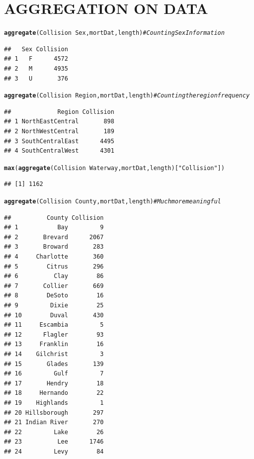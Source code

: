 \documentclass{article}\usepackage[]{graphicx}\usepackage[]{color}
\makeatletter
\newcommand{\hlstr}[1]{\textcolor[rgb]{0.192,0.494,0.8}{#1}}%
\newcommand{\hlcom}[1]{\textcolor[rgb]{0.678,0.584,0.686}{\textit{#1}}}%
\newcommand{\hlopt}[1]{\textcolor[rgb]{0,0,0}{#1}}%
\newcommand{\hlstd}[1]{\textcolor[rgb]{0.345,0.345,0.345}{#1}}%
\newcommand{\hlkwd}[1]{\textcolor[rgb]{0.737,0.353,0.396}{\textbf{#1}}}%
\newenvironment{kframe}{%
 \def\at@end@of@kframe{}%
 \ifinner\ifhmode%
  \def\at@end@of@kframe{\end{minipage}}%
  \begin{minipage}{\columnwidth}%
 \fi\fi%
 \def\FrameCommand##1{\hskip\@totalleftmargin \hskip-\fboxsep
 \colorbox{shadecolor}{##1}\hskip-\fboxsep
     \hskip-\linewidth \hskip-\@totalleftmargin \hskip\columnwidth}%
 \MakeFramed {\advance\hsize-\width
   \@totalleftmargin\z@ \linewidth\hsize
   \@setminipage}}%
 {\par\unskip\endMakeFramed%
 \at@end@of@kframe}
\newenvironment{knitrout}{}{} %
\makeatother
\begin{document}
\section*{AGGREGATION ON DATA}
\begin{knitrout}
\color{fgcolor}\begin{kframe}
\begin{alltt}
\hlkwd{aggregate}\hlstd{(Collision} \hlopt{~} \hlstd{Sex, mortDat, length)} \hlcom{#Counting Sex Information}
\end{alltt}
\begin{verbatim}
##   Sex Collision
## 1   F      4572
## 2   M      4935
## 3   U       376
\end{verbatim}
\begin{alltt}
\hlkwd{aggregate}\hlstd{(Collision} \hlopt{~} \hlstd{Region, mortDat, length)} \hlcom{#Counting the region frequency }
\end{alltt}
\begin{verbatim}
##             Region Collision
## 1 NorthEastCentral       898
## 2 NorthWestCentral       189
## 3 SouthCentralEast      4495
## 4 SouthCentralWest      4301
\end{verbatim}
\begin{alltt}
\hlkwd{max}\hlstd{(}\hlkwd{aggregate}\hlstd{(Collision} \hlopt{~} \hlstd{Waterway, mortDat, length)[}\hlstr{"Collision"}\hlstd{])}
\end{alltt}
\begin{verbatim}
## [1] 1162
\end{verbatim}
\begin{alltt}
\hlkwd{aggregate}\hlstd{(Collision} \hlopt{~} \hlstd{County, mortDat, length)} \hlcom{# Much more meaningful}
\end{alltt}
\begin{verbatim}
##          County Collision
## 1           Bay         9
## 2       Brevard      2067
## 3       Broward       283
## 4     Charlotte       360
## 5        Citrus       296
## 6          Clay        86
## 7       Collier       669
## 8        DeSoto        16
## 9         Dixie        25
## 10        Duval       430
## 11     Escambia         5
## 12      Flagler        93
## 13     Franklin        16
## 14    Gilchrist         3
## 15       Glades       139
## 16         Gulf         7
## 17       Hendry        18
## 18     Hernando        22
## 19    Highlands         1
## 20 Hillsborough       297
## 21 Indian River       270
## 22         Lake        26
## 23          Lee      1746
## 24         Levy        84

\end{verbatim}
\end{kframe}
\end{knitrout}
\end{document}
